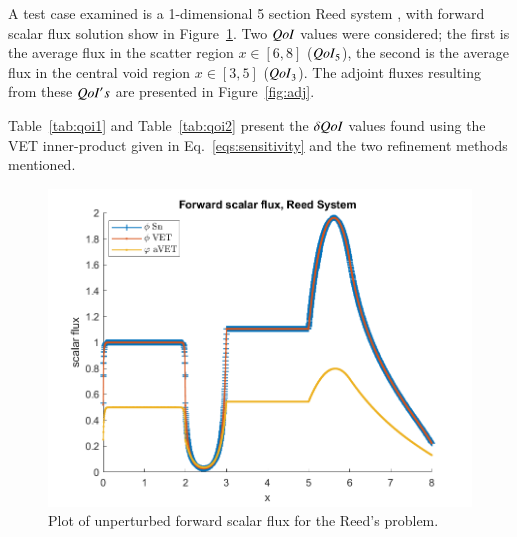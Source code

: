 \documentclass{anstrans}
\newcommand{\qoi}{{\it QoI}\xspace}
\begin{document}
A test case examined is a 1-dimensional 5 section Reed system \cite{ReedProb}, with forward scalar flux solution show in Figure~\ref{fig:Flux4}. Two $\qoi$ values were considered; the first is the average flux in the scatter region $x\in[6,8]$ ($\qoi_5$), the second is the average flux in the central void region $x\in[3,5]$ ($\qoi_3$). The adjoint fluxes resulting from these $\qoi's$ are presented in Figure~\ref{fig:adj}.

Table~\ref{tab:qoi1} and Table~\ref{tab:qoi2} present the $\delta \qoi$ values found using the VET inner-product given in Eq.~\eqref{eqs:sensitivity} and the two refinement methods mentioned.



\begin{figure}
\centering
 \includegraphics[scale=0.5]{../Thesis/figures2/7phi.png}
 \caption{Plot of unperturbed forward scalar flux for the Reed's problem.}
\label{fig:Flux4}
\end{figure}
\end{document}
